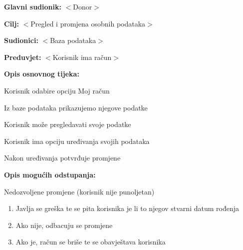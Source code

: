 					\noindent {}
					\begin{packed_item}
						
						\item \textbf{Glavni sudionik:} $<$Donor$>$
						\item \textbf{Cilj:} $<$Pregled i promjena osobnih podataka$>$
						\item \textbf{Sudionici:} $<$Baza podataka$>$
						\item \textbf{Preduvjet:} $<$Korisnik ima račun$>$
						\item \textbf{Opis osnovnog tijeka:}
						
						\begin{packed_enum}
							
							\item Korisnik odabire opciju Moj račun
							\item Iz baze podataka prikazujemo njegove podatke
							\item Korisnik može pregledavati svoje podatke
							\item Korisnik ima opciju uređivanja svojih podataka
							\item Nakon uređivanja potvrđuje promjene
							
						\end{packed_enum}
						
						\item \textbf{Opis mogućih odstupanja:}
						
						\begin{packed_item}
							
							\item[5.a] Nedozvoljene promjene (korisnik nije punoljetan)
							\begin{enumerate}
								\item Javlja se greška te se pita korisnika je li to njegov stvarni datum rođenja
								\item Ako nije, odbacuju se promjene
								\item Ako je, račun se briše te se obavještava korisnika
								
							\end{enumerate}
							
						\end{packed_item}
						
					\end{packed_item}
					
